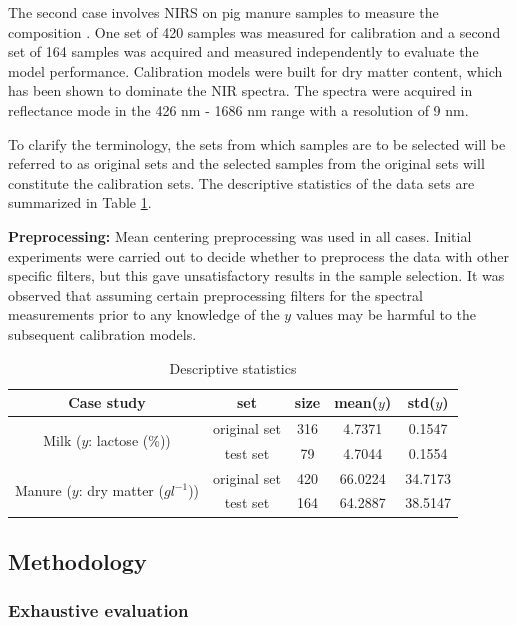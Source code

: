 \documentclass[journal=ancham,manuscript=article]{achemso}
\begin{document}
The second case involves NIRS on pig manure samples to measure the composition \cite{Saeys2005}. One set of 420 samples was measured for calibration and a second set of 164 samples was acquired and measured independently to evaluate the model performance. Calibration models were built for dry matter content, which has been shown to dominate the NIR spectra. The spectra were acquired in reflectance mode in the 426 nm - 1686 nm range with a resolution of 9 nm.

To clarify the terminology, the sets from which samples are to be selected will be referred to as original sets and the selected samples from the original sets will constitute the calibration sets. The descriptive statistics of the data sets are summarized in Table \ref{tab_descriptive_statistics}.

\textbf{Preprocessing:} Mean centering preprocessing was used in all cases. Initial experiments were carried out to decide whether to preprocess the data with other specific filters, but this gave unsatisfactory results in the sample selection. It was observed that assuming certain preprocessing filters for the spectral measurements prior to any knowledge of the $y$ values may be harmful to the subsequent calibration models. 

\begin{table}[t]
\centering
\begin{tabular}{|c|c|c|c|c|} 
\hline
Case study	& set & size & mean($y$) & std($y$)  	\\
\hline
\multirow{2}{10em}{Milk ($y$: lactose (\%))} & original set & 316 & 4.7371 & 0.1547\\
& test set & 79 & 4.7044 & 0.1554\\
\hline
\multirow{2}{10em}{Manure ($y$: dry matter ($gl^{-1}$))} & original set & 420 & 66.0224 & 34.7173\\
& test set & 164 & 64.2887 & 38.5147 \\
\hline 


\end{tabular}
\caption{Descriptive statistics}
\label{tab_descriptive_statistics}
\end{table}

\subsection{Methodology}\label{methodology}

\subsubsection{Exhaustive evaluation}
\end{document}
